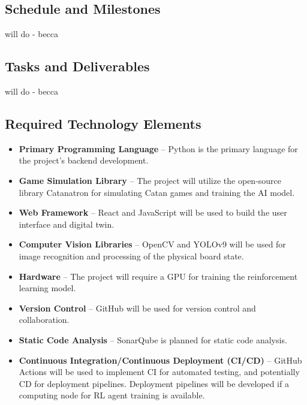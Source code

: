 \documentclass{article}
\begin{document}
\subsection{Schedule and Milestones}\label{subsec:schedule}
\raggedright will do - becca

\subsection{Tasks and Deliverables}\label{subsec:tasks}
\raggedright will do - becca


\subsection{Required Technology Elements}\label{subsec:requiredtech}
\begin{itemize}
    \item \textbf{Primary Programming Language} – Python is the primary language for the project's backend development.
    \item \textbf{Game Simulation Library} – The project will utilize the open-source library Catanatron for simulating Catan games and training the AI model.
    \item \textbf{Web Framework} – React and JavaScript will be used to build the user interface and digital twin.
    \item \textbf{Computer Vision Libraries} – OpenCV and YOLOv9 will be used for image recognition and processing of the physical board state.
    \item \textbf{Hardware} – The project will require a GPU for training the reinforcement learning model.
    \item \textbf{Version Control} – GitHub will be used for version control and collaboration.
    \item \textbf{Static Code Analysis} – SonarQube is planned for static code analysis.
    \item \textbf{Continuous Integration/Continuous Deployment (CI/CD)} – GitHub Actions will be used to implement CI for automated testing, and potentially CD for deployment pipelines. Deployment pipelines will be developed if a computing node for RL agent training is available.
\end{itemize}
\end{document}
